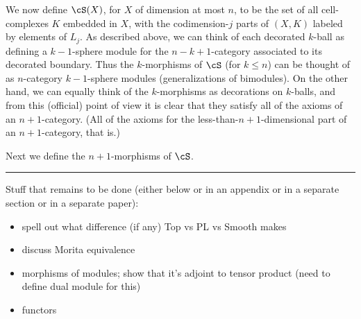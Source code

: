We now define $\cS(X)$, for $X$ of dimension at most $n$, to be the set of all 
cell-complexes $K$ embedded in $X$, with the codimension-$j$ parts of $(X, K)$ labeled
by elements of $L_j$.
As described above, we can think of each decorated $k$-ball as defining a $k{-}1$-sphere module
for the $n{-}k{+}1$-category associated to its decorated boundary.
Thus the $k$-morphisms of $\cS$ (for $k\le n$) can be thought 
of as $n$-category $k{-}1$-sphere modules 
(generalizations of bimodules).
On the other hand, we can equally think of the $k$-morphisms as decorations on $k$-balls, 
and from this (official) point of view it is clear that they satisfy all of the axioms of an
$n{+}1$-category.
(All of the axioms for the less-than-$n{+}1$-dimensional part of an $n{+}1$-category, that is.)

\medskip

Next we define the $n{+}1$-morphisms of $\cS$.








\medskip
\hrule
\medskip

\medskip






Stuff that remains to be done (either below or in an appendix or in a separate section or in
a separate paper):
\begin{itemize}
\item spell out what difference (if any) Top vs PL vs Smooth makes
\item discuss Morita equivalence
\item morphisms of modules; show that it's adjoint to tensor product
(need to define dual module for this)
\item functors
\end{itemize}


